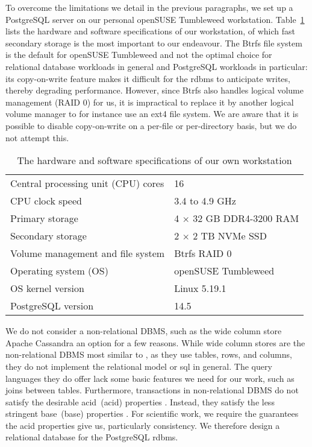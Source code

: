 To overcome the limitations we detail in the previous paragraphs, we set up a PostgreSQL server on our personal openSUSE Tumbleweed workstation.
Table~\ref{tbl:hardware} lists the hardware and software specifications of our workstation, of which fast secondary storage is the most important to our endeavour.
The Btrfs file system \citep{DBLP:journals/tos/RodehBM13} is the default for openSUSE Tumbleweed and not the optimal choice for relational database workloads in general and PostgreSQL workloads in particular\thinspace: its copy-on-write feature makes it difficult for the \acrshort{rdbms} to anticipate writes, thereby degrading performance.
However, since Btrfs also handles logical volume management (RAID 0) for us, it is impractical to replace it by another logical volume manager to for instance use an ext4 file system.
We are aware that it is possible to disable copy-on-write on a per-file or per-directory basis, but we do not attempt this.

\begin{table}
  \centering
\begin{tabular}{ll}
Central processing unit (CPU) cores & 16 \\
CPU clock speed & 3.4 to 4.9 GHz \\
Primary storage               & 4 $\times$ 32 GB DDR4-3200 RAM \\
Secondary storage             & 2 $\times$ 2 TB NVMe SSD \\
Volume management and file system & Btrfs RAID 0 \\
Operating system (OS) & openSUSE Tumbleweed \\
OS kernel version & Linux 5.19.1 \\
PostgreSQL version & 14.5
\end{tabular}
  \caption{The hardware and software specifications of our own workstation}
  \label{tbl:hardware}
\end{table}

We do not consider a non-relational DBMS, such as the wide column store Apache Cassandra \citep{DBLP:journals/sigops/LakshmanM10} an option for a few reasons.
While wide column stores are the non-relational DBMS most similar to , as they use tables, rows, and columns, they do not implement the relational model or \acrshort{sql} in general.
The query languages they do offer lack some basic features we need for our work, such as joins between tables.
Furthermore, transactions in non-relational DBMS do not satisfy the desirable \acrlong{acid}~(\acrshort{acid}) properties \citep{DBLP:journals/csur/HarderR83}.
Instead, they satisfy the less stringent \acrlong{base}~(\acrshort{base}) properties \citep{DBLP:journals/queue/Pritchett08}.
For scientific work, we require the guarantees the \acrshort{acid} properties give us, particularly consistency.
We therefore design a relational database for the PostgreSQL \acrshort{rdbms}.

